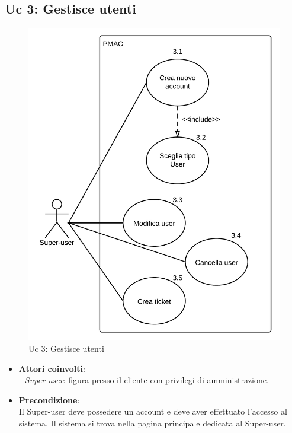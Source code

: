 {\subsection{Uc 3: Gestisce utenti}
\begin{figure}[ht]
\centering
\caption{Uc 3: Gestisce utenti}
\includegraphics[scale=0.9]{images/cap1/UseCase/Uc3} %
\end{figure}

\begin{itemize}

\item \textbf{Attori coinvolti}:\\
\emph{- Super-user}: figura presso il cliente con privilegi di amministrazione.

\item \textbf{Precondizione}:\\
Il Super-user deve possedere un account e deve aver effettuato l'accesso al sistema. Il sistema si trova nella pagina principale dedicata al Super-user.


\end{itemize}}
